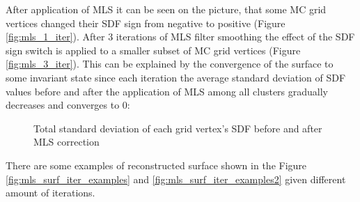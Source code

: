 After application of MLS it can be seen on the picture, that some MC grid vertices changed their SDF sign from negative to positive (Figure \ref{fig:mls_1_iter}). After 3 iterations of MLS filter smoothing the effect of the SDF sign switch is applied to a smaller subset of MC grid vertices (Figure \ref{fig:mls_3_iter}). This can be explained by the convergence of the surface to some invariant state since each iteration the average standard deviation of SDF values before and after the application of MLS among all clusters gradually decreases and converges to 0:
\begin{figure}[H]
	\begin{center}
	\end{center}
	\caption{Total standard deviation of each grid vertex's SDF before and after MLS correction}
	\label{fig:mls_std_dev}
\end{figure}
There are some examples of reconstructed surface shown in the Figure \ref{fig:mls_surf_iter_examples} and \ref{fig:mls_surf_iter_examples2} given different amount of iterations.
